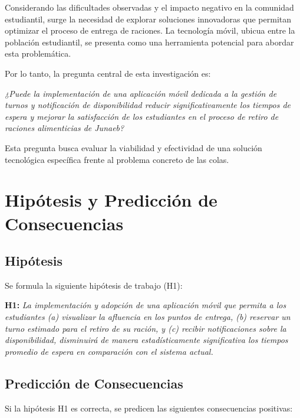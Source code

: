 \documentclass[11pt, a4paper]{article}
\begin{document}
Considerando las dificultades observadas y el impacto negativo en la comunidad estudiantil, surge la necesidad de explorar soluciones innovadoras que permitan optimizar el proceso de entrega de raciones. La tecnología móvil, ubicua entre la población estudiantil, se presenta como una herramienta potencial para abordar esta problemática.

Por lo tanto, la pregunta central de esta investigación es:
\vspace{0.5cm} %
\begin{center}
\textit{¿Puede la implementación de una aplicación móvil dedicada a la gestión de turnos y notificación de disponibilidad reducir significativamente los tiempos de espera y mejorar la satisfacción de los estudiantes en el proceso de retiro de raciones alimenticias de Junaeb?}
\end{center}
\vspace{0.5cm} %

Esta pregunta busca evaluar la viabilidad y efectividad de una solución tecnológica específica frente al problema concreto de las colas.

\section{Hipótesis y Predicción de Consecuencias}
\label{sec:hipotesis}

\subsection{Hipótesis}
Se formula la siguiente hipótesis de trabajo (H1):

\textbf{H1:} \textit{La implementación y adopción de una aplicación móvil que permita a los estudiantes (a) visualizar la afluencia en los puntos de entrega, (b) reservar un turno estimado para el retiro de su ración, y (c) recibir notificaciones sobre la disponibilidad, disminuirá de manera estadísticamente significativa los tiempos promedio de espera en comparación con el sistema actual.}

\subsection{Predicción de Consecuencias}
Si la hipótesis H1 es correcta, se predicen las siguientes consecuencias positivas:
\end{document}
